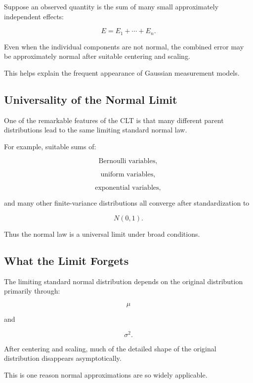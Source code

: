 Suppose an observed quantity is the sum of many small approximately
independent effects:

\[
E
=
E_1+\cdots+E_n.
\]

Even when the individual components are not normal, the combined error
may be approximately normal after suitable centering and scaling.

This helps explain the frequent appearance of Gaussian measurement
models.

\subsection{Universality of the Normal Limit}
\label{subsec:normal-limit-universality}

One of the remarkable features of the CLT is that many different parent
distributions lead to the same limiting standard normal law.

For example, suitable sums of:

\[
\text{Bernoulli variables},
\]

\[
\text{uniform variables},
\]

\[
\text{exponential variables},
\]

and many other finite-variance distributions all converge after
standardization to

\[
N(0,1).
\]

Thus the normal law is a universal limit under broad conditions.

\subsection{What the Limit Forgets}
\label{subsec:clt-forgets-parent-distribution}

The limiting standard normal distribution depends on the original
distribution primarily through:

\[
\boxed{
\mu
}
\]

and

\[
\boxed{
\sigma^2.
}
\]

After centering and scaling, much of the detailed shape of the original
distribution disappears asymptotically.

This is one reason normal approximations are so widely applicable.

